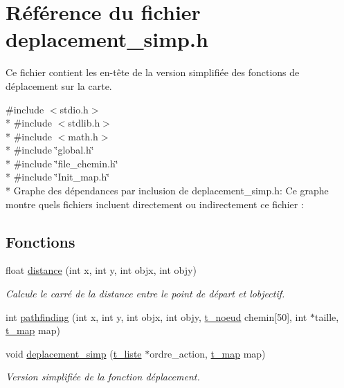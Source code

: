 \hypertarget{a00014}{}\section{Référence du fichier deplacement\+\_\+simp.\+h}
\label{a00014}


Ce fichier contient les en-\/tête de la version simplifiée des fonctions de déplacement sur la carte.  


{\ttfamily \#include $<$stdio.\+h$>$}\\*
{\ttfamily \#include $<$stdlib.\+h$>$}\\*
{\ttfamily \#include $<$math.\+h$>$}\\*
{\ttfamily \#include \char`\"{}global.\+h\char`\"{}}\\*
{\ttfamily \#include \char`\"{}file\+\_\+chemin.\+h\char`\"{}}\\*
{\ttfamily \#include \char`\"{}Init\+\_\+map.\+h\char`\"{}}\\*
Graphe des dépendances par inclusion de deplacement\+\_\+simp.\+h\+:
Ce graphe montre quels fichiers incluent directement ou indirectement ce fichier \+:
\subsection*{Fonctions}
\begin{DoxyCompactItemize}
\item 
float \hyperlink{a00014_a80925ed5707102e43bea03e23ea9ad8b}{distance} (int x, int y, int objx, int objy)
\begin{DoxyCompactList}\small\item\em Calcule le carré de la distance entre le point de départ et l\textquotesingle{}objectif. \end{DoxyCompactList}\item 
int \hyperlink{a00014_a2b683d97d1725e260c204a6f76777c29}{pathfinding} (int x, int y, int objx, int objy, \hyperlink{a00008}{t\+\_\+noeud} chemin\mbox{[}50\mbox{]}, int $\ast$taille, \hyperlink{a00007}{t\+\_\+map} map)
\item 
void \hyperlink{a00014_a1d333438042f9b24b4a5f00823d41ad5}{deplacement\+\_\+simp} (\hyperlink{a00006}{t\+\_\+liste} $\ast$ordre\+\_\+action, \hyperlink{a00007}{t\+\_\+map} map)
\begin{DoxyCompactList}\small\item\em Version simplifiée de la fonction déplacement. \end{DoxyCompactList}\end{DoxyCompactItemize}


